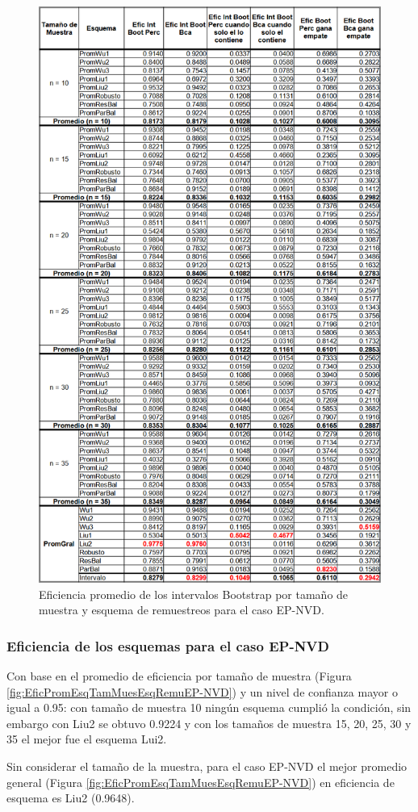 \begin{figure}[ht] 
	\centering 
	\includegraphics[width=0.55\linewidth]{img/EP_NVD_Efic_Boots.png} 
	\caption{Eficiencia promedio de los intervalos Bootstrap por tamaño de muestra y esquema de remuestreos para el caso EP-NVD.} 
	\label{fig:EficPromIntBootsTamMuestEsqRemuEP-NVD}
\end{figure}
\FloatBarrier

\subsubsection{Eficiencia de los esquemas para el caso EP-NVD}
Con base en el promedio de eficiencia por tamaño de muestra (Figura \ref{fig:EficPromEsqTamMuesEsqRemuEP-NVD}) y un nivel de confianza mayor o igual a 0.95: con tamaño de muestra 10 ningún esquema cumplió la condición, sin embargo con Liu2 se obtuvo 0.9224 y con los tamaños de muestra 15, 20, 25, 30 y 35 el mejor fue el esquema Lui2.
\vspace{.5cm}

Sin considerar el tamaño de la muestra, para el caso EP-NVD el mejor promedio general (Figura \ref{fig:EficPromEsqTamMuesEsqRemuEP-NVD}) en eficiencia de esquema es Liu2 (0.9648).


